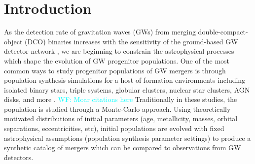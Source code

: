 \documentclass[twocolumn]{aastex631}
\newcommand{\kw}[1]{{\color{rb4}[KW: #1 ]}}
\newcommand{\wf}[1]{\textcolor{cyan}{WF: #1}}
\newcommand{\kb}[1]{\textcolor{pink}{#1}}
\begin{document}
\section{Introduction}
As the detection rate of gravitation waves (GWs) from merging
double-compact-object (DCO) binaries increases with the sensitivity of the
ground-based GW detector network
\citep{Abbott2018,LIGOScientificCollaboration2015,Buikema2020,Tse2019,Acernese2015,Acernese2019,Aso2013,Akutsu2021},
we are beginning to constrain the astrophysical processes which shape the
evolution of GW progenitor populations. One of the most common ways to study
progenitor populations of GW mergers is through population synthesis simulations
for a host of formation environments including isolated binary stars, triple
systems, globular clusters, nuclear star clusters, AGN disks, and more
\citep{Mandel2022}. \wf{Moar citations here} Traditionally in these studies, the
population is studied through a Monte-Carlo approach.  Using theoretically
motivated distributions of initial parameters (age, metallicity, masses, orbital
separations, eccentricities, etc), initial populations are evolved with fixed
astrophysical assumptions (population synthesis parameter settings) to produce a
synthetic catalog of mergers which can be compared to observations from
GW detectors.



\end{document}
